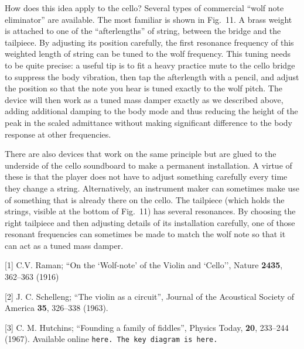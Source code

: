   How does this idea apply to the cello? Several types of commercial “wolf note 
  eliminator” are available. The most familiar is shown in Fig.\ 11. A brass 
  weight is attached to one of the “afterlengths” of string, between the bridge 
  and the tailpiece. By adjusting its position carefully, the first resonance 
  frequency of this weighted length of string can be tuned to the wolf 
  frequency. This tuning needs to be quite precise: a useful tip is to fit a 
  heavy practice mute to the cello bridge to suppress the body vibration, then 
  tap the afterlength with a pencil, and adjust the position so that the note 
  you hear is tuned exactly to the wolf pitch. The device will then work as a 
  tuned mass damper exactly as we described above, adding additional damping to 
  the body mode and thus reducing the height of the peak in the scaled 
  admittance without making significant difference to the body response at 
  other frequencies. 


  There are also devices that work on the same principle but are glued to the 
  underside of the cello soundboard to make a permanent installation. A virtue 
  of these is that the player does not have to adjust something carefully every 
  time they change a string. Alternatively, an instrument maker can sometimes 
  make use of something that is already there on the cello. The tailpiece 
  (which holds the strings, visible at the bottom of Fig.\ 11) has several 
  resonances. By choosing the right tailpiece and then adjusting details of its 
  installation carefully, one of those resonant frequencies can sometimes be 
  made to match the wolf note so that it can act as a tuned mass damper. 



  \sectionreferences{}[1] C.V. Raman; ``On the `Wolf-note' of the Violin and 
  `Cello'', Nature \textbf{2435}, 362--363 (1916) 

  [2] J. C. Schelleng; ``The violin as a circuit'', Journal of the Acoustical 
  Society of America \textbf{35}, 326--338 (1963). 

  [3] C. M. Hutchins; ``Founding a family of fiddles'', Physics Today, 
  \textbf{20}, 233--244 (1967). Available online \tt{}here\rm{}. The key 
  diagram is \tt{}here\rm{}. 